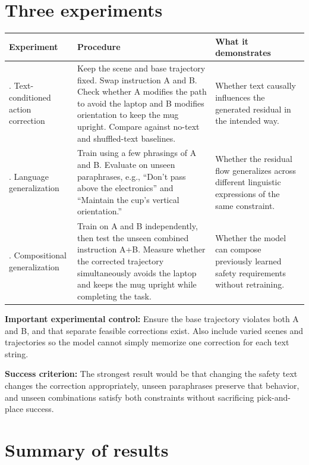 \documentclass[11pt]{article}
\begin{document}
\section{Three experiments}

\begin{center}
\small
\begin{tabularx}{\linewidth}{@{}>{\raggedright\arraybackslash}p{2.8cm}YY@{}}
\toprule
Experiment & Procedure & What it demonstrates \\
. Text-conditioned action correction &
Keep the scene and base trajectory fixed. Swap instruction A and B. Check whether A modifies the
path to avoid the laptop and B modifies orientation to keep the mug upright. Compare against
no-text and shuffled-text baselines. &
Whether text causally influences the generated residual in the intended way. \\
. Language generalization &
Train using a few phrasings of A and B. Evaluate on unseen paraphrases, e.g., ``Don't pass above
the electronics'' and ``Maintain the cup's vertical orientation.'' &
Whether the residual flow generalizes across different linguistic expressions of the same
constraint. \\
. Compositional generalization &
Train on A and B independently, then test the unseen combined instruction A+B. Measure whether
the corrected trajectory simultaneously avoids the laptop and keeps the mug upright while
completing the task. &
Whether the model can compose previously learned safety requirements without retraining. \\
\bottomrule
\end{tabularx}
\end{center}

\noindent\textbf{Important experimental control:} Ensure the base trajectory violates both A and
B, and that separate feasible corrections exist. Also include varied scenes and trajectories so
the model cannot simply memorize one correction for each text string.

\noindent\textbf{Success criterion:} The strongest result would be that changing the safety text
changes the correction appropriately, unseen paraphrases preserve that behavior, and unseen
combinations satisfy both constraints without sacrificing pick-and-place success.

\section{Summary of results}
\end{document}

